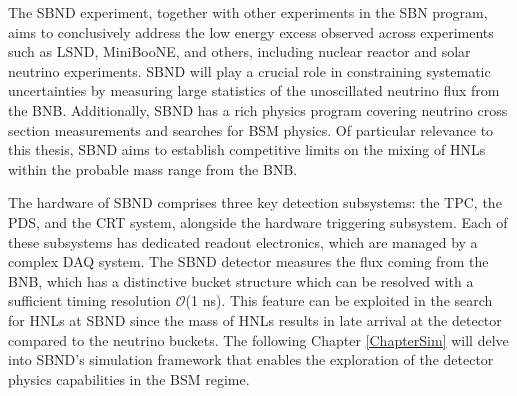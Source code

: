 The SBND experiment, together with other experiments in the SBN program, aims to conclusively address the low energy excess observed across experiments such as LSND, MiniBooNE, and others, including nuclear reactor and solar neutrino experiments. 
SBND will play a crucial role in constraining systematic uncertainties by measuring large statistics of the unoscillated neutrino flux from the BNB.
Additionally, SBND has a rich physics program covering neutrino cross section measurements and searches for BSM physics. 
Of particular relevance to this thesis, SBND aims to establish competitive limits on the mixing of HNLs within the probable mass range from the BNB.

The hardware of SBND comprises three key detection subsystems: the TPC, the PDS, and the CRT system, alongside the hardware triggering subsystem. 
Each of these subsystems has dedicated readout electronics, which are managed by a complex DAQ system.
The SBND detector measures the flux coming from the BNB, which has a distinctive bucket structure which can be resolved with a sufficient timing resolution $\mathcal{O}$(1 ns). 
This feature can be exploited in the search for HNLs at SBND since the mass of HNLs results in late arrival at the detector compared to the neutrino buckets. 
The following Chapter \ref{ChapterSim} will delve into SBND's simulation framework that enables the exploration of the detector physics capabilities in the BSM regime.  

